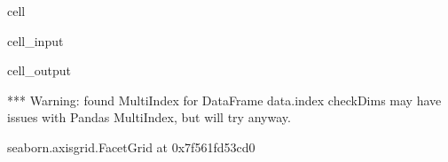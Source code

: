 \documentclass[letterpaper,table,10pt,english]{jupyterBook}
\begin{document}
\begin{sphinxuseclass}{cell}\begin{sphinxVerbatimInput}

\begin{sphinxuseclass}{cell_input}
\begin{sphinxVerbatim}[commandchars=\\\{\}]
  
     
                 
                     
\end{sphinxVerbatim}

\end{sphinxuseclass}\end{sphinxVerbatimInput}
\begin{sphinxVerbatimOutput}

\begin{sphinxuseclass}{cell_output}
\begin{sphinxVerbatim}[commandchars=\\\{\}]
*** Warning: found MultiIndex for DataFrame data.index \PYGZhy{} checkDims may have issues with Pandas MultiIndex, but will try anyway.
\end{sphinxVerbatim}

\begin{sphinxVerbatim}[commandchars=\\\{\}]
\PYGZlt{}seaborn.axisgrid.FacetGrid at 0x7f561fd53cd0\PYGZgt{}
\end{sphinxVerbatim}

\noindent{}

\end{sphinxuseclass}\end{sphinxVerbatimOutput}

\end{sphinxuseclass}
\end{document}
